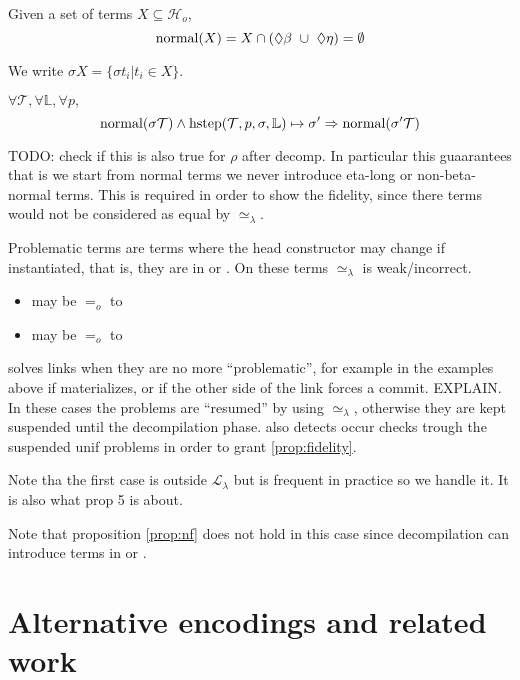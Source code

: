 \documentclass[sigconf,natbib=false]{acmart}
\newcommand{\EqualRel}{\ensuremath{=}}
\newcommand{\UnifRel}{\ensuremath{\simeq}}
\newcommand{\Eo}{\ensuremath{\EqualRel_o}\xspace}
\newcommand{\Ue}{\ensuremath{\UnifRel_\lambda}\xspace}
\newcommand{\llambda}{\ensuremath{\mathcal{L}_\lambda}\xspace}
\newcommand{\Ho}{\ensuremath{\mathcal{H}_o}\xspace}
\begin{document}
\newcommand{\normal}{\ensuremath{\mathrm{normal}}}
\begin{definition}
Given a set of terms $X \subseteq \Ho{}$,
$$
\normal(X) =
X \cap (\maybebeta{} ~\cup~ \maybeeta{}) = \emptyset
$$
\end{definition}

\noindent
We write $\sigma X = \{ \sigma t_i | t_i \in X\}$.

\begin{proposition}\label{prop:nf}
$\forall \mathcal{T}, \forall \mathbb{L}, \forall p,$
$$
\normal(\sigma\mathcal{T}) \land
\stepH{\mathcal{T}}{p}{\sigma}{\mathbb{L}}{\sigma'}
\Rightarrow \normal(\sigma'\mathcal{T})
$$
\end{proposition}

TODO: check if this is also true for $\rho$ after decomp.
In particular this guaarantees that is we start from normal terms
we never introduce eta-long or non-beta-normal terms. This is required in
order to show the fidelity, since there terms would not be considered
as equal by \Ue.



Problematic terms are terms where the head constructor may
change if instantiated, that is, they are in \maybebeta or \maybeeta.
On these terms \Ue is weak/incorrect.
\begin{itemize}
\item {} may be \Eo to 
\item {} may be \Eo to  
\end{itemize}

\noindent
\solve{} solves links when they are no more ``problematic'', for example
in the examples above if  materializes, or if the
other side of the link forces a commit. EXPLAIN.
In these cases the problems are ``resumed'' by using \Ue,
otherwise they are kept suspended until the
decompilation phase.
\solve also detects occur checks trough the suspended unif problems
in order to grant \cref{prop:fidelity}.

Note tha the first case is outside $\llambda$ but is frequent in practice
so we handle it. It is also what prop 5 is about.

Note that proposition \ref{prop:nf} does not hold in this case since
decompilation can introduce terms in \maybebeta or \maybebeta.
\section{Alternative encodings and related work}
\end{document}

